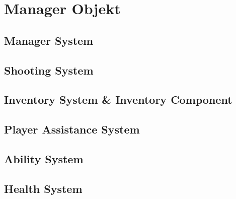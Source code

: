 \chapter{Manager Objekt}



\section{Manager System}



\section{Shooting System}



\section{Inventory System \& Inventory Component}



\section{Player Assistance System}



\section{Ability System}



\section{Health System}


